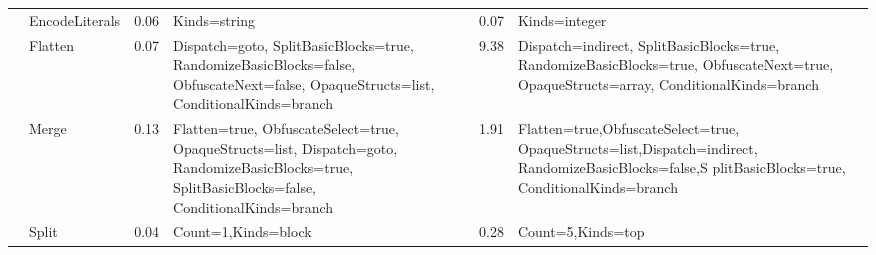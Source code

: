 \begin{table*}[!hp]
\begin{footnotesize}
\begin{tabular}{|p{1.5cm}|l|l|p{5cm}|l|p{5cm}|}
                                                                               & EncodeLiterals                                                        & 0.06                                                    &  Kinds=string                                                                                                                                                                            & 0.07                                                    &  Kinds=integer                                                                                                                                                                               \\ \cline{2-6} 
                                                                               & Flatten                                                                & 0.07                                                    & \raggedright Dispatch=goto, SplitBasicBlocks=true, RandomizeBasicBlocks=false, ObfuscateNext=false, OpaqueStructs=list, ConditionalKinds=branch              & 9.38                                                    &        Dispatch=indirect, SplitBasicBlocks=true, RandomizeBasicBlocks=true,  ObfuscateNext=true,  OpaqueStructs=array, ConditionalKinds=branch                \\ \cline{2-6} 
                                                                               & Merge                                                                  & 0.13                                                    & 
                                                            Flatten=true, ObfuscateSelect=true, OpaqueStructs=list, Dispatch=goto,  RandomizeBasicBlocks=true, SplitBasicBlocks=false, ConditionalKinds=branch & 1.91                                                    & Flatten=true,ObfuscateSelect=true, OpaqueStructs=list,Dispatch=indirect, RandomizeBasicBlocks=false,S plitBasicBlocks=true, ConditionalKinds=branch \\ \cline{2-6} 
                                                                               & Split                                                                  & 0.04                                                    &  Count=1,Kinds=block                                                                                                                                                                     & 0.28                                                    &  Count=5,Kinds=top                                                                                                                                                                           \\ \cline{2-6} 

\end{tabular}
\end{footnotesize}
\end{table*}
